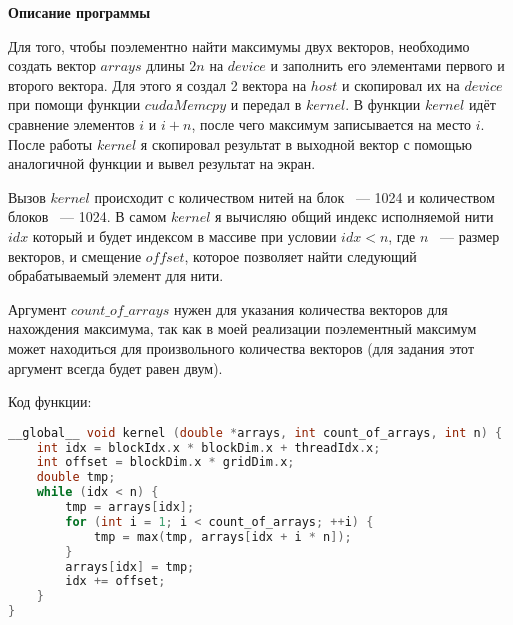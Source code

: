 \textbf{\large Описание программы}

Для того, чтобы поэлементно найти максимумы двух векторов, необходимо создать вектор $arrays$ длины $2n$ на $device$ и заполнить его элементами первого и второго вектора. Для этого я создал 2 вектора на $host$ и скопировал их на $device$ при помощи функции $cudaMemcpy$ и передал в $kernel$. В функции $kernel$ идёт сравнение элементов $i$ и $i + n$, после чего максимум записывается на место $i$. После работы $kernel$ я скопировал результат в выходной вектор с помощью аналогичной функции и вывел результат на экран.

Вызов $kernel$ происходит с количеством нитей на блок ~--- 1024 и количеством блоков ~--- 1024.
В самом $kernel$ я вычисляю общий индекс исполняемой нити $idx$ который и будет индексом в массиве при условии $idx < n$, где $n$ ~--- размер векторов, и смещение $offset$, которое позволяет найти следующий обрабатываемый элемент для нити.

Аргумент $count\_of\_arrays$ нужен для указания количества векторов для нахождения максимума, так как в моей реализации поэлементный максимум может находиться для произвольного количества векторов (для задания этот аргумент всегда будет равен двум).

Код функции:

\begin{lstlisting}[basicstyle=\normalfont, language=C++]
__global__ void kernel (double *arrays, int count_of_arrays, int n) {
    int idx = blockIdx.x * blockDim.x + threadIdx.x;
    int offset = blockDim.x * gridDim.x;
    double tmp;
    while (idx < n) {
        tmp = arrays[idx];
        for (int i = 1; i < count_of_arrays; ++i) {
            tmp = max(tmp, arrays[idx + i * n]);
        }
        arrays[idx] = tmp;
        idx += offset;
    }
}
\end{lstlisting}

\vspace{15pt}

